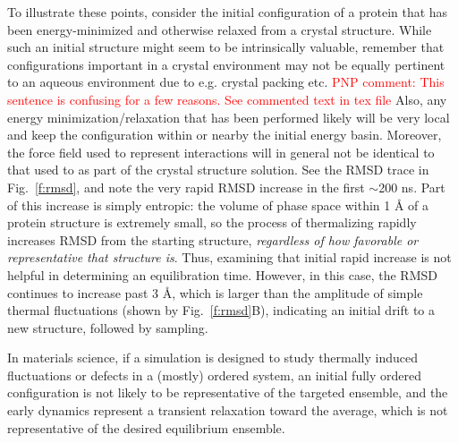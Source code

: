 To illustrate these points, consider the initial configuration of a protein that has been energy-minimized and otherwise relaxed from a crystal structure.
While such an initial structure might seem to be intrinsically valuable, remember that configurations important in a crystal environment may not be equally pertinent to an aqueous environment due to e.g. crystal packing etc. \textcolor{red}{PNP comment:  This sentence is confusing for a few reasons.  See commented text in tex file}
Also, any energy minimization/relaxation that has been performed likely will be very local and keep the configuration within or nearby the initial energy basin.  Moreover, the force field used to represent interactions will in general not be identical to that used to as part of the crystal structure solution.
See the RMSD trace in Fig.\ \ref{f:rmsd}, and note the very rapid RMSD increase in the first $\sim$200 ns. Part of this increase is simply entropic: the volume of phase space within 1 {\AA} of a protein structure is extremely small, so the process of thermalizing rapidly increases RMSD from the starting structure, \emph{regardless of how favorable or representative that structure is}.  Thus, examining that initial rapid increase is not helpful in determining an equilibration time.  However, in this case, the RMSD continues to increase past 3 {\AA}, which is larger than the amplitude of simple thermal fluctuations (shown by Fig.\ \ref{f:rmsd}B), indicating an initial drift to a new structure, followed by sampling.

In materials science, if a simulation is designed to study thermally induced fluctuations or defects in a (mostly) ordered system,
an initial fully ordered configuration is not likely to be representative of the targeted ensemble, and the early dynamics represent a transient relaxation toward the average, which is not representative of the desired equilibrium ensemble.

